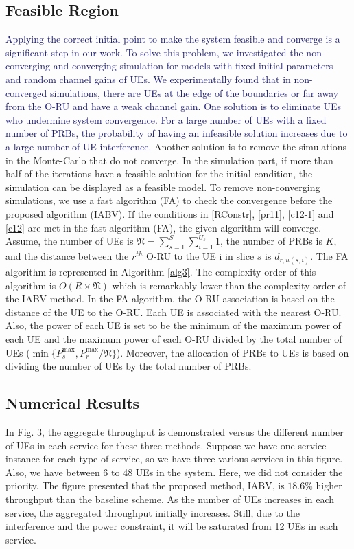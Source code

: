 \documentclass[lettersize,journal]{IEEEtran}
\begin{document}
\subsection{Feasible Region}\label{fr}
\textcolor{MidnightBlue}{Applying the correct initial point to make the system feasible and converge is a significant step in our work.
To solve this problem, we investigated the non-converging and converging simulation for models with fixed initial parameters and random channel gains of UEs.
We experimentally found that in non-converged simulations, there are UEs at the edge of the boundaries or far away from the O-RU and have a weak channel gain. One solution is to eliminate UEs who undermine system convergence.
For a large number of UEs with a fixed number of PRBs, the probability of having an infeasible solution increases due to a large number of UE interference.}
Another solution is to remove the simulations in the Monte-Carlo that do not converge.
In the simulation part, if more than half of the iterations have a feasible solution for the initial condition, the simulation can be displayed as a feasible model.
To remove non-converging simulations, we use a fast algorithm (FA) to check the convergence before
the proposed algorithm (IABV).
If the conditions in \eqref{RConstr}, \eqref{pr11}, \eqref{c12-1} and \eqref{c12} are met in the fast algorithm (FA), the given algorithm will converge.
Assume, the number of UEs is $\mathfrak{N} = \sum_{s=1}^{S}\sum_{i=1}^{U_s}1$,
the number of PRBs is $K$, and the distance between the $r^{th}$ O-RU to the UE i in slice $s$ is $d_{r,u(s,i)}$.
The FA algorithm is represented in Algorithm \ref{alg3}.
The complexity order of this algorithm is $O(R\times \mathfrak{N})$ which is remarkably lower than the complexity order of the IABV method.
In the FA algorithm, the O-RU association is based on the distance of the UE to the O-RU.
Each UE is associated with the nearest O-RU. Also, the power of each UE is set to be the minimum of the maximum power of each UE and the maximum power of each O-RU divided by the total number of UEs ($\min\{P_s^{\max}, P_r^{\max}/\mathfrak{N}\}$).
Moreover, the allocation of PRBs to UEs is based on dividing the number of UEs by the total number of PRBs.
\vspace*{-1.5em}
\subsection{Numerical Results}
In Fig. 3, the aggregate throughput is demonstrated versus the different number of UEs in each service for these three methods. Suppose we have one service instance for each type of service, so we have three various services in this figure. Also, we have between 6 to 48 UEs in the system.
Here, we did not consider the priority. The figure presented that the proposed method, IABV, is $18.6\%$ higher throughput than the baseline scheme.
As the number of UEs increases in each service, the aggregated throughput initially increases. Still, due to the interference and the power constraint, it will be saturated from 12 UEs in each service.
\end{document}
